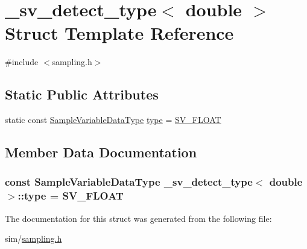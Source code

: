 \hypertarget{struct__sv__detect__type_3_01double_01_4}{\section{\+\_\+sv\+\_\+detect\+\_\+type$<$ double $>$ Struct Template Reference}
\label{struct__sv__detect__type_3_01double_01_4}
}


{\ttfamily \#include $<$sampling.\+h$>$}

\subsection*{Static Public Attributes}
\begin{DoxyCompactItemize}
\item 
static const \hyperlink{sampling_8h_aebe1c9f7e0bdb2dfac88bf77cf6c695e}{Sample\+Variable\+Data\+Type} \hyperlink{struct__sv__detect__type_3_01double_01_4_a2fd5e4b40cfb09ca5fa9e73cf4e11dbd}{type} = \hyperlink{sampling_8h_aebe1c9f7e0bdb2dfac88bf77cf6c695eaf1631c0808b6554059af5ff3ccdaca15}{S\+V\+\_\+\+F\+L\+O\+A\+T}
\end{DoxyCompactItemize}


\subsection{Member Data Documentation}
\hypertarget{struct__sv__detect__type_3_01double_01_4_a2fd5e4b40cfb09ca5fa9e73cf4e11dbd}{
\subsubsection[{type}]{\setlength{\rightskip}{0pt plus 5cm}const {\bf Sample\+Variable\+Data\+Type} {\bf \+\_\+sv\+\_\+detect\+\_\+type}$<$ double $>$\+::type = {\bf S\+V\+\_\+\+F\+L\+O\+A\+T}\hspace{0.3cm}{\ttfamily [static]}}}\label{struct__sv__detect__type_3_01double_01_4_a2fd5e4b40cfb09ca5fa9e73cf4e11dbd}


The documentation for this struct was generated from the following file\+:\begin{DoxyCompactItemize}
\item 
sim/\hyperlink{sampling_8h}{sampling.\+h}\end{DoxyCompactItemize}
